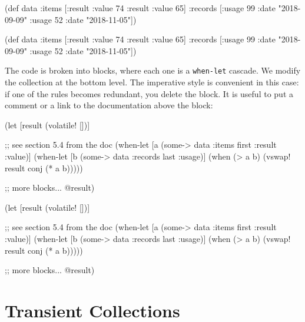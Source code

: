 \ifx\DEVICETYPE\MOBILE

\begin{clojure}
(def data
  {:items [{:result {:value 74}}
           {:result {:value 65}}]
   :records [{:usage 99
              :date "2018-09-09"}
             {:usage 52
              :date "2018-11-05"}]})
\end{clojure}

\else

\begin{clojure}
(def data
  {:items [{:result {:value 74}}
           {:result {:value 65}}]
   :records [{:usage 99 :date "2018-09-09"}
             {:usage 52 :date "2018-11-05"}]})
\end{clojure}

\fi

The code is broken into blocks, where each one is a \verb|when-let| cascade. We modify the collection at the bottom level.
The imperative style is convenient in this case: if one of the rules becomes redundant, you delete the block. It is useful to put a comment or a link to the documentation above the block:

\ifx\DEVICETYPE\MOBILE

\begin{clojure}
(let [result (volatile! [])]

  ;; see section 5.4 from the doc
  (when-let [a (some-> data
                       :items
                       first
                       :result
                       :value)]
    (when-let [b (some-> data
                       :records
                       last
                       :usage)]
      (when (> a b)
        (vswap! result conj (* a b)))))

  ;; more blocks...
  @result)
\end{clojure}

\else

\begin{clojure}
(let [result (volatile! [])]

  ;; see section 5.4 from the doc
  (when-let [a (some-> data :items first :result :value)]
    (when-let [b (some-> data :records last :usage)]
      (when (> a b)
        (vswap! result conj (* a b)))))

  ;; more blocks...
  @result)
\end{clojure}

\fi

\section{Transient Collections}

